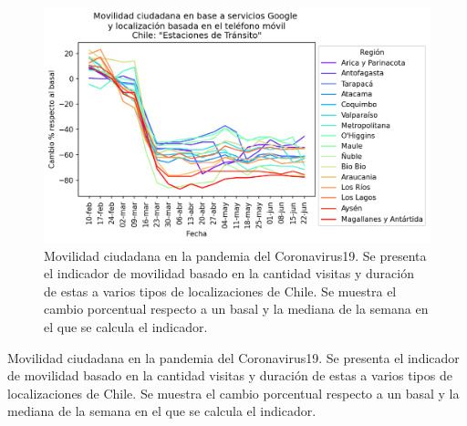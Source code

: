 \documentclass{article}
\begin{document}
\begin{figure}[H]
	\centering
	\begin{adjustbox}{width=0.8\textwidth}
		\includegraphics{./figtab/chile_media.png} %
	\end{adjustbox}
	\caption{Movilidad ciudadana en la pandemia del Coronavirus19. Se presenta el indicador de movilidad basado en la cantidad visitas y duración de estas a varios tipos de localizaciones de Chile. Se muestra el cambio porcentual respecto a un basal y la mediana de la semana en el que se calcula el indicador. }
	\label{fig:movilidad chile}
\end{figure}


\begin{table}[H]
	\begin{adjustbox}{width=1\textwidth}
	\end{adjustbox}
	\caption{Movilidad ciudadana en la pandemia del Coronavirus19. Se presenta el indicador de movilidad basado en la cantidad visitas y duración de estas a varios tipos de localizaciones de Chile. Se muestra el cambio porcentual respecto a un basal y la mediana de la semana en el que se calcula el indicador. }
	\label{tab:movilidad chile}
\end{table}


\end{document}
